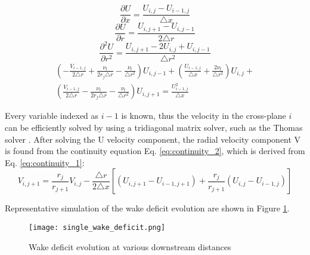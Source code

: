 \documentclass{umthesis}
\begin{document}
\begin{equation}\label{eq:du_dx}
  \frac{\partial U}{\partial x}=\frac{U_{i,j}-U_{i-1,j}}{\triangle x}
\end{equation}
\begin{equation}\label{eq:du_dr}
  \frac{\partial U}{\partial r}=\frac{U_{i,j+1}-U_{i,j-1}}{2 \triangle r}
\end{equation}
\begin{equation}\label{eq:du2_dr2}
  \frac{\partial^2 U}{\partial r^2}=\frac{U_{i,j+1}-2U_{i,j}+U_{i,j-1}}{\triangle r^2}
\end{equation}
\begin{equation}\label{eq:x_momentum_3}
  \begin{split}
  (- \frac{V _{i-1,j}}{2\triangle r}+\frac{\nu _t}{2r_j \triangle r}-\frac{\nu _t}{\triangle r^2})U_{i,j-1} +(\frac{U_{i-1,j}}{\triangle x}+\frac{2\nu _t}{\triangle r^2})U_{i,j}+ \\
  (\frac{V_{i-1,j}}{2\triangle r}-\frac{\nu _t}{2r_j\triangle r}-\frac{\nu _t}{\triangle r^2})U_{i,j+1}=\frac{U^2 _{i-1,j}}{\triangle x}
  \end{split}
\end{equation}



Every variable indexed as $i-1$ is known, thus the velocity in the cross-plane $i$ can be efficiently solved by using a tridiagonal matrix solver, such as the Thomas solver \cite{Thomas}. After solving the U velocity component, the radial velocity component V is found from the continuity equation Eq. \ref{eq:continuity_2}, which is derived from Eq. \ref{eq:continuity_1}:
\begin{equation}\label{eq:continuity_2}
V_{i,j+1}=\frac{r_j}{r_{j+1}}V_{i,j}-\frac{\triangle r}{2\triangle x}[(U_{i,j+1}-U_{i-1,j+1})+\frac{r_j}{r_{j+1}}(U_{i,j}-U_{i-1,j})]
\end{equation}

Representative simulation of the wake deficit evolution are shown in Figure \ref{fig:wake_deficit}.

\begin{figure}
  \centering
  \texttt{[image: single\_wake\_deficit.png]}
  \caption{Wake deficit evolution at various downstream distances}\label{fig:wake_deficit}
\end{figure}

\end{document}
